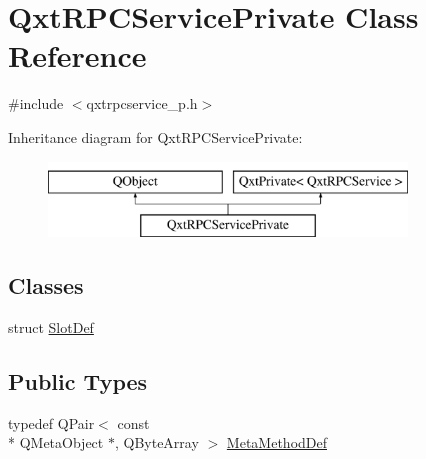 \hypertarget{class_qxt_r_p_c_service_private}{\section{Qxt\-R\-P\-C\-Service\-Private Class Reference}
\label{class_qxt_r_p_c_service_private}
}


{\ttfamily \#include $<$qxtrpcservice\-\_\-p.\-h$>$}

Inheritance diagram for Qxt\-R\-P\-C\-Service\-Private\-:\begin{figure}[H]
\begin{center}
\leavevmode
\includegraphics[height=2.000000cm]{class_qxt_r_p_c_service_private}
\end{center}
\end{figure}
\subsection*{Classes}
\begin{DoxyCompactItemize}
\item 
struct \hyperlink{struct_qxt_r_p_c_service_private_1_1_slot_def}{Slot\-Def}
\end{DoxyCompactItemize}
\subsection*{Public Types}
\begin{DoxyCompactItemize}
\item 
typedef Q\-Pair$<$ const \\*
Q\-Meta\-Object $\ast$, Q\-Byte\-Array $>$ \hyperlink{class_qxt_r_p_c_service_private_a307b87cfecad046cb6bc59a6141251ac}{Meta\-Method\-Def}
\end{DoxyCompactItemize}
